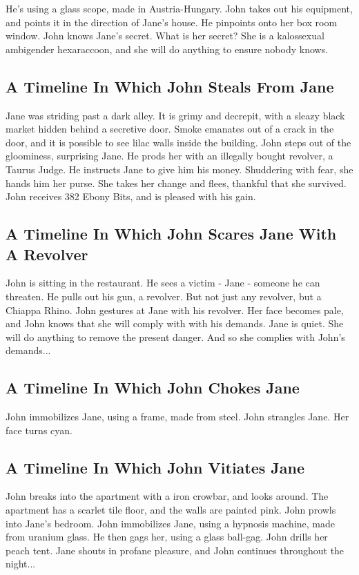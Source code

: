 \documentclass{article}
\begin{document}
He's using a glass scope, made in Austria{-}Hungary.
John takes out his equipment, and points it in the direction of Jane's house. He pinpoints onto her box room window.
John knows Jane's secret. What is her secret? She is a kalossexual ambigender hexaraccoon, and she will do anything to ensure nobody knows.
\subsection{A Timeline In Which John Steals From Jane}


Jane was striding past a dark alley.
It is grimy and decrepit, with a sleazy black market hidden behind a secretive door.
Smoke emanates out of a crack in the door, and it is possible to see lilac walls inside the building.
John steps out of the gloominess, surprising Jane.
He prods her with an illegally bought revolver, a Taurus Judge.
He instructs Jane to give him his money.
Shuddering with fear, she hands him her purse.
She takes her change and flees, thankful that she survived.
John receives 382 Ebony Bits, and is pleased with his gain.
\subsection{A Timeline In Which John Scares Jane With A Revolver}


John is sitting in the restaurant.
He sees a victim {-} Jane {-} someone he can threaten. He pulls out his gun, a revolver.
But not just any revolver, but a Chiappa Rhino.
John gestures at Jane with his revolver. Her face becomes pale, and John knows that she will comply with with his demands.
Jane is quiet. She will do anything to remove the present danger. And so she complies with John's demands...
\subsection{A Timeline In Which John Chokes Jane}


John immobilizes Jane, using a frame, made from steel.
John strangles Jane.
Her face turns cyan.
\subsection{A Timeline In Which John Vitiates Jane}


John breaks into the apartment with a iron crowbar, and looks around.
The apartment has a scarlet tile floor, and the walls are painted pink.
John prowls into Jane's bedroom.
John immobilizes Jane, using a hypnosis machine, made from uranium glass.
He then gags her, using a glass ball{-}gag.
John drills her peach tent.
Jane shouts in profane pleasure, and John continues throughout the night...
\end{document}
